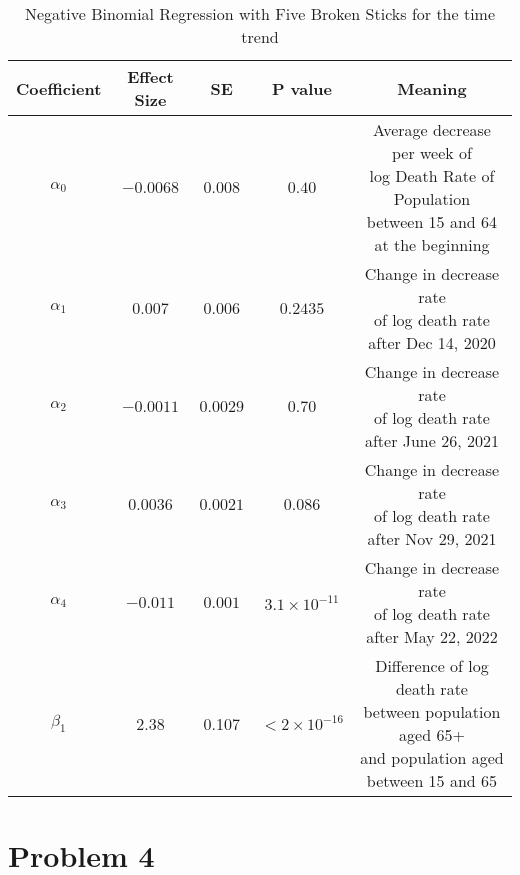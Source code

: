 \documentclass[12pt]{article}
\begin{document}
\begin{enumerate}[(a)]
	
	\begin{table}[htbp]
		\centering
		\begin{tabular}{ccccc}
			\toprule
			Coefficient & Effect Size & SE & P value & Meaning\\
			\midrule
			$\alpha_{0}$ & $-0.0068$ & $0.008$ & $0.40$ & \makecell{Average decrease per week of \\ log Death Rate of  Population \\ between 15 and 64 \\ at the beginning}\\
			\addlinespace[0.2cm]
			$\alpha_{1}$ & $0.007$ & $0.006$ & $0.2435$& \makecell{Change in decrease rate \\ of log death rate\\ after Dec 14, 2020}\\
			\addlinespace[0.2cm]
			$\alpha_{2}$ & $-0.0011$ & $0.0029$ & $0.70$& \makecell{Change in decrease rate \\ of log death rate\\ after June 26, 2021}\\
			\addlinespace[0.2cm]
			$\alpha_{3}$ & $0.0036$ & $0.0021$ & $0.086$& \makecell{Change in decrease rate \\ of log death rate\\ after Nov 29, 2021}\\
			\addlinespace[0.2cm]
			$\alpha_{4}$ & $-0.011$ & $0.001$ & $3.1\times 10^{-11}$& \makecell{Change in decrease rate \\ of log death rate\\ after May 22, 2022}\\
			\addlinespace[0.2cm]
			$\beta_{1}$ & 2.38 & 0.107 & $<2\times 10^{-16}$ & \makecell{Difference of log death rate \\between population aged 65+ \\ and population aged between 15 and 65}\\
			\bottomrule
		\end{tabular}
		\caption{Negative Binomial Regression with Five Broken Sticks for the time trend}\label{sticknb}
	\end{table}
\end{enumerate}


\section*{Problem 4}
\end{document}

